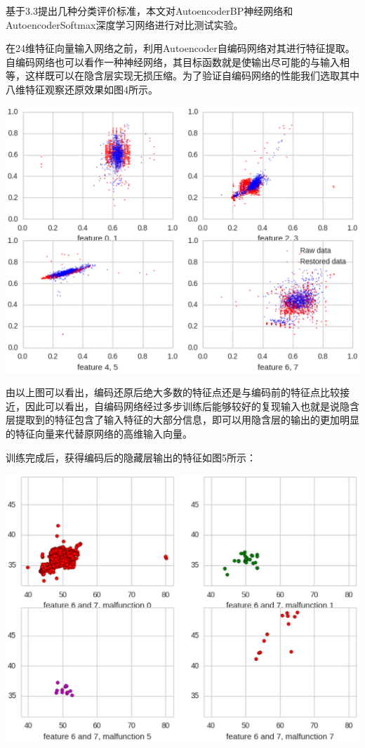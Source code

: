 \documentclass{ctacn}%
\begin{document}
\begin{multicols}{2}
基于3.3提出几种分类评价标准，本文对AutoencoderBP神经网络和AutoencoderSoftmax深度学习网络进行对比测试实验。

在24维特征向量输入网络之前，利用Autoencoder自编码网络对其进行特征提取。自编码网络也可以看作一种神经网络，其目标函数就是使输出尽可能的与输入相等，这样既可以在隐含层实现无损压缩。为了验证自编码网络的性能我们选取其中八维特征观察还原效果如图4所示。

\begin{center}
	\includegraphics[scale=0.4, trim=0 0 0 0]{figs/autoencoder_restore}\\
	\label{fig5}
\end{center}

由以上图可以看出，编码还原后绝大多数的特征点还是与编码前的特征点比较接近，因此可以看出，自编码网络经过多步训练后能够较好的复现输入也就是说隐含层提取到的特征包含了输入特征的大部分信息，即可以用隐含层的输出的更加明显的特征向量来代替原网络的高维输入向量。

训练完成后，获得编码后的隐藏层输出的特征如图5所示：

\begin{center}
	\includegraphics[scale=0.4, trim=0 0 0 0]{figs/autoencoder_encoded_features}\\
	\label{fig6}
\end{center}


\end{multicols}
\end{document}
